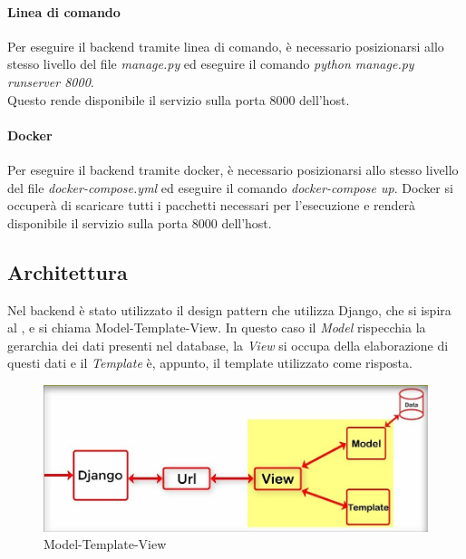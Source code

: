 \paragraph{Linea di comando}
Per eseguire il backend tramite linea di comando, è necessario posizionarsi allo stesso livello del file \textit{manage.py} ed eseguire il comando \textit{python manage.py runserver 8000}.\\Questo rende disponibile il servizio sulla porta 8000 dell'host.
\paragraph{Docker}
Per eseguire il backend tramite docker, è necessario posizionarsi allo stesso livello del file \textit{docker-compose.yml} ed eseguire il comando \textit{docker-compose up}. Docker si occuperà di scaricare tutti i pacchetti necessari per l'esecuzione e renderà disponibile il servizio sulla porta 8000 dell'host.
\subsection{Architettura}
Nel backend è stato utilizzato il design pattern che utilizza Django, che si ispira al , e si chiama Model-Template-View.
In questo caso il \textit{Model} rispecchia la gerarchia dei dati presenti nel database, la \textit{View} si occupa della elaborazione di questi dati e il \textit{Template} è, appunto, il template utilizzato come risposta.
\begin{figure}[H]
	\centering
	\includegraphics[width=16cm]{res/images/mvt.png}
	\caption{Model-Template-View}
	\label{fig:Model-Template-View}
\end{figure}
